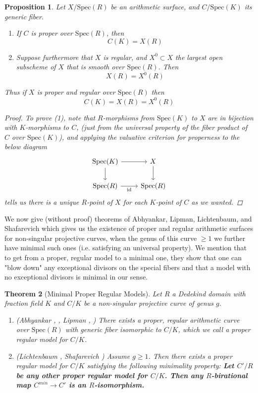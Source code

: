 \documentclass{article}
\newtheorem{theorem}{Theorem}[section]
\theoremstyle{definition}
\theoremstyle{remark}
\theoremstyle{plain}
\newtheorem{proposition}[theorem]{Proposition}
\begin{document}
\begin{proposition}\label{proper-regular-prop}
	Let $X/\text{Spec}(R)$ be an arithmetic surface, and $C/\text{Spec}(K)$ its generic fiber.
\begin{enumerate}
	\item If $C$ is proper over $\text{Spec}(R)$, then 
		\[C(K) = X(R)\]
	\item Suppose furthermore that $X$ is regular, and $X^0 \subset X$ the largest open subscheme of $X$ that is smooth over $\text{Spec}(R)$. 
		Then 
		\[X(R) = X^0(R)\]
\end{enumerate}
Thus if $X$ is proper and regular over $\text{Spec}(R)$ then
\[C(K) = X(R) = X^0(R)\]
\begin{proof}
	To prove (1), note that $R$-morphisms from $\text{Spec}(K)$ to $X$ are in bijection with $K$-morphisms to $C$, (just from the universal property of the fiber product of $C$ over $\text{Spec}(K)$), and applying the valuative criterion for properness to the below diagram
\[\begin{tikzcd}
	{\text{Spec}(K)} & X \\
	{\text{Spec}(R)} & {\text{Spec}(R)}
	\arrow[from=1-1, to=1-2]
	\arrow[from=1-1, to=2-1]
	\arrow[from=1-2, to=2-2]
	\arrow["{\text{id}}"', from=2-1, to=2-2]
\end{tikzcd}\]
tells us there is a unique $R$-point of $X$ for each $K$-point of $C$ as we wanted.
\end{proof}

\end{proposition}

We now give (without proof) theorems of Abhyankar, Lipman, Lichtenbaum, and Shafarevich which gives us the existence of proper and regular arithmetic surfaces for non-singular projective curves, when the genus of this curve $\geq 1$ we further have minimal such ones (i.e. satisfying an universal property).
We mention that to get from a proper, regular model to a minimal one, they show that one can "blow down" any exceptional divisors on the special fibers and that a model with no exceptional divisors is minimal in our sense.

\begin{theorem}[Minimal Proper Regular Models]\label{min-as}
	Let $R$ a Dedekind domain with fraction field $K$ and  $C/K$ be a non-singular projective curve of genus $g$.
\begin{enumerate}
	\item (Abhyankar \cite{Abh1}, \cite{Abh2}, Lipman \cite{Lip1}, \cite{Lip2}) There exists a proper, regular arithmetic curve over $\text{Spec}(R)$ with generic fiber isomorphic to $C/K$, which we call a proper regular model for $C/K$.
	\item(Lichtenbaum \cite{Licht}, Shafarevich \cite{Shaf}) Assume $g \geq 1$. 
		Then there exists a proper regular model for $C/K$ satisfying the following minimality property:   \textbf{Let $C'/R$ be any other proper regular model for $C/K$. Then any $R$-birational map $C^{min} \to C'$ is an $R$-isomorphism.} 

\end{enumerate}	
\end{theorem}
\end{document}
